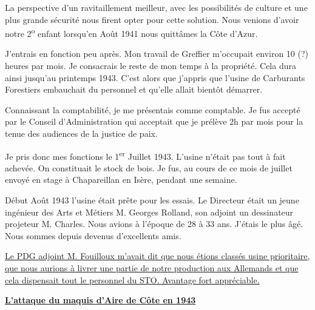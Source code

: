 \clearpage


La perspective d’un ravitaillement meilleur, avec les possibilités de culture et une plus grande
sécurité nous firent opter pour cette solution. Nous venions d’avoir notre 2\textsuperscript{o}
enfant lorsqu’en Août 1941 nous quittâmes la Côte d’Azur.

\vspace{0.45cm}

J’entrais en fonction peu après. Mon travail de Greffier m’occupait environ 10 (?) heures par
mois. Je consacrais le reste de mon temps à la propriété. Cela dura ainsi jusqu’au printemps
1943. C’est alors que j’appris que l’usine de Carburants Forestiers embauchait du personnel
et qu’elle allait bientôt démarrer.

\vspace{0.45cm}

Connaissant la comptabilité, je me présentais comme comptable. Je fus accepté par le Conseil
d’Administration qui acceptait que je prélève 2h par mois pour la tenue des audiences de la
justice de paix.

\vspace{0.45cm}

Je pris donc mes fonctions le 1\textsuperscript{er} Juillet 1943. L’usine n’était pas tout à fait achevée. On
constituait le stock de bois. Je fus, au cours de ce mois de juillet envoyé en stage à
Chapareillan en Isère, pendant une semaine.

\vspace{0.45cm}

Début Août 1943 l’usine était prête pour les essais. Le Directeur était un jeune ingénieur des
Arts et Métiers M. Georges Rolland, son adjoint un dessinateur projeteur M. Charles. Nous
avions à l’époque de 28 à 33 ans. J’étais le plus âgé. Nous sommes depuis devenus
d’excellents amis.

\vspace{0.45cm}

\underline{Le PDG adjoint M. Fouilloux m’avait dit que nous étions classés usine prioritaire, que nous aurions à livrer une partie de notre production aux Allemands et que cela dispensait tout le personnel du STO. Avantage fort appréciable.}

\vspace{0.55cm}

\underline{\textbf{L’attaque du maquis d’Aire de Côte en 1943}}

